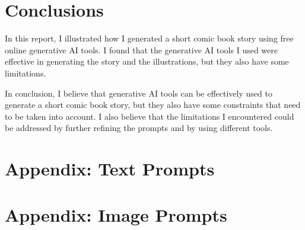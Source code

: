 \documentclass[a4paper,11pt]{article}
\begin{document}
\newpage
\section{Conclusions}
In this report, I illustrated how I generated a short comic book story using free online generative AI tools. I found that the generative AI tools I used were effective in generating the story and the illustrations, but they also have some limitations.

In conclusion, I believe that generative AI tools can be effectively used to generate a short comic book story, but they also have some constraints that need to be taken into account. I also believe that the limitations I encountered could be addressed by further refining the prompts and by using different tools. 





\newpage
\appendix

\section{Appendix: Text Prompts}



\newpage
\section{Appendix: Image Prompts}


\newpage 
 
 
\end{document}
